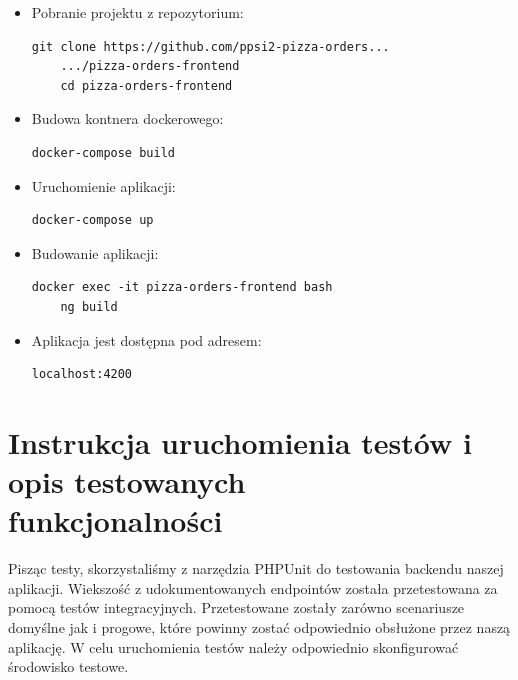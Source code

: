 \documentclass[12pt]{article}
\begin{document}
\begin{itemize}
	\item Pobranie projektu z repozytorium:
	\begin{lstlisting}[]
	git clone https://github.com/ppsi2-pizza-orders...
	.../pizza-orders-frontend
	cd pizza-orders-frontend
	\end{lstlisting}
	\item Budowa kontnera dockerowego:
	\begin{lstlisting}[]
	docker-compose build
	\end{lstlisting}
	\item Uruchomienie aplikacji:
	\begin{lstlisting}[]
	docker-compose up
	\end{lstlisting}
	\item Budowanie aplikacji:
	\begin{lstlisting}[]
	docker exec -it pizza-orders-frontend bash
	ng build
	\end{lstlisting}
	\item Aplikacja jest dostępna pod adresem:
	\begin{lstlisting}[]
	localhost:4200
	\end{lstlisting}
\end{itemize}
\vspace{1cm}
\clearpage
\section{Instrukcja uruchomienia testów i opis testowanych \\ funkcjonalności}
\vspace{1cm}

Pisząc testy, skorzystaliśmy z narzędzia PHPUnit do testowania backendu naszej aplikacji.
Wiekszość z udokumentowanych endpointów została przetestowana za pomocą testów integracyjnych. Przetestowane zostały zarówno scenariusze domyślne jak i progowe, które powinny zostać odpowiednio obsłużone przez naszą aplikację.
W celu uruchomienia testów należy odpowiednio skonfigurować środowisko testowe.
\end{document}
